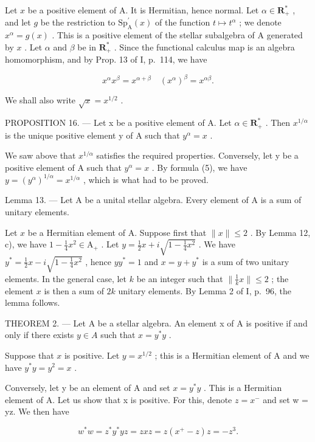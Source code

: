 Let \(x\) be a positive element of A. It is Hermitian, hence normal. Let \(\alpha \in \mathbf{R}_{+}^{*}\) , and let \(g\) be the restriction to \(\mathrm{Sp}_{\mathrm{A}}^{\prime}(x)\) of the function \(t \mapsto t^{\alpha}\) ; we denote \(x^{\alpha} = g(x)\) . This is a positive element of the stellar subalgebra of A generated by \(x\) . Let \(\alpha\) and \(\beta\) be in \(\mathbf{R}_{+}^{*}\) . Since the functional calculus map is an algebra homomorphism, and by Prop. 13 of I, p.~114, we have

\[
x ^ {\alpha} x ^ {\beta} = x ^ {\alpha + \beta} \quad (x ^ {\alpha}) ^ {\beta} = x ^ {\alpha \beta}.\tag{5}
\]

We shall also write \(\sqrt{x} = x^{1/2}\) .

PROPOSITION 16. — Let x be a positive element of A. Let \(\alpha \in \mathbf{R}_{+}^{*}\) . Then \(x^{1/\alpha}\) is the unique positive element y of A such that \(y^{\alpha} = x\) .

We saw above that \(x^{1/\alpha}\) satisfies the required properties. Conversely, let y be a positive element of A such that \(y^{\alpha} = x\) . By formula (5), we have \(y = (y^{\alpha})^{1/\alpha} = x^{1/\alpha}\) , which is what had to be proved.

Lemma 13. — Let A be a unital stellar algebra. Every element of A is a sum of unitary elements.

Let \(x\) be a Hermitian element of A. Suppose first that \(\| x \| \leqslant 2\) . By Lemma 12, c), we have \(1 - \frac{1}{4} x^2 \in \mathrm{A}_+\) . Let \(y = \frac{1}{2} x + i\sqrt{1 - \frac{1}{4} x^2}\) . We have \(y^* = \frac{1}{2} x - i\sqrt{1 - \frac{1}{4} x^2}\) , hence \(yy^* = 1\) and \(x = y + y^*\) is a sum of two unitary elements. In the general case, let \(k\) be an integer such that \(\| \frac{1}{k} x \| \leqslant 2\) ; the element \(x\) is then a sum of \(2k\) unitary elements. By Lemma 2 of I, p.~96, the lemma follows.

THEOREM 2. — Let A be a stellar algebra. An element x of A is positive if and only if there exists \(y \in A\) such that \(x = y^{*}y\) .

Suppose that \(x\) is positive. Let \(y = x^{1/2}\) ; this is a Hermitian element of A and we have \(y^*y = y^2 = x\) .

Conversely, let y be an element of A and set \(x = y^{*}y\) . This is a Hermitian element of A. Let us show that x is positive. For this, denote \(z = x^{-}\) and set w = yz. We then have

\[
w ^ {*} w = z ^ {*} y ^ {*} y z = z x z = z (x ^ {+} - z) z = - z ^ {3}.
\]

